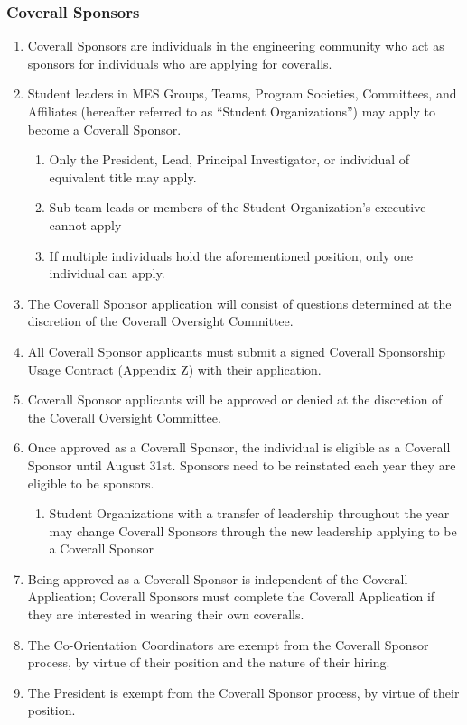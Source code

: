 \begin{enumerate}
\hypertarget{coverall-sponsors}{%
 \subsubsection{Coverall Sponsors}
 \label{coverall-sponsors}}

\begin{enumerate}
 \item
  Coverall Sponsors are individuals in the engineering community who act
  as sponsors for individuals who are applying for coveralls.
 \item
  Student leaders in MES Groups, Teams, Program Societies, Committees,
  and Affiliates (hereafter referred to as ``Student Organizations'')
  may apply to become a Coverall Sponsor.

  \begin{enumerate}
   \item
    Only the President, Lead, Principal Investigator, or individual of
    equivalent title may apply.
   \item
    Sub-team leads or members of the Student Organization's executive
    cannot apply
   \item
    If multiple individuals hold the aforementioned position, only one
    individual can apply.
  \end{enumerate}
 \item
  The Coverall Sponsor application will consist of questions determined
  at the discretion of the Coverall Oversight Committee.
 \item
  All Coverall Sponsor applicants must submit a signed Coverall
  Sponsorship Usage Contract (Appendix Z) with their application.
 \item
  Coverall Sponsor applicants will be approved or denied at the
  discretion of the Coverall Oversight Committee.
 \item
  Once approved as a Coverall Sponsor, the individual is eligible as a
  Coverall Sponsor until August 31st. Sponsors need to be reinstated
  each year they are eligible to be sponsors.
  \begin{enumerate}
   \item
    Student Organizations with a transfer of leadership throughout the
    year may change Coverall Sponsors through the new leadership
    applying to be a Coverall Sponsor
  \end{enumerate}
 \item
  Being approved as a Coverall Sponsor is independent of the Coverall
  Application; Coverall Sponsors must complete the Coverall Application
  if they are interested in wearing their own coveralls.
 \item
  The Co-Orientation Coordinators are exempt from the Coverall Sponsor
  process, by virtue of their position and the nature of their hiring.
 \item
  The President is exempt from the Coverall Sponsor process, by virtue
  of their position.


\end{enumerate}
\end{enumerate}

